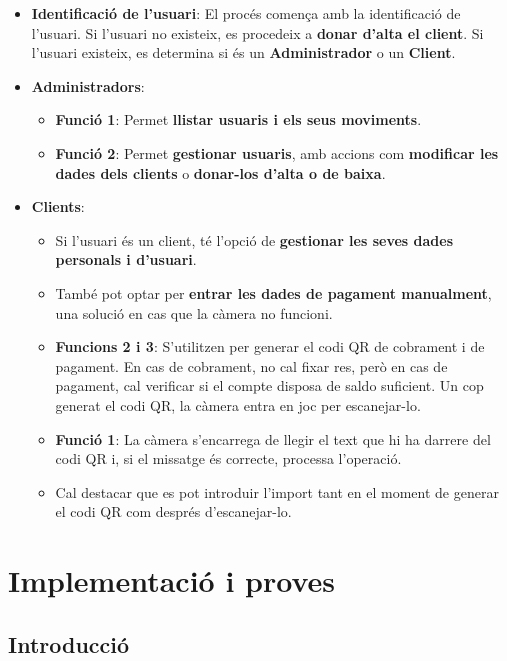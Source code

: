 \documentclass[a4paper,12pt,twoside]{ThesisStyle}
\begin{document}
\begin{itemize}
    \item \textbf{Identificació de l'usuari}: El procés comença amb la identificació de l'usuari. Si l'usuari no existeix, es procedeix a \textbf{donar d'alta el client}. Si l'usuari existeix, es determina si és un \textbf{Administrador} o un \textbf{Client}.
    
    \item \textbf{Administradors}: 
    \begin{itemize}
        \item \textbf{Funció 1}: Permet \textbf{llistar usuaris i els seus moviments}.
        \item \textbf{Funció 2}: Permet \textbf{gestionar usuaris}, amb accions com \textbf{modificar les dades dels clients} o \textbf{donar-los d'alta o de baixa}.
    \end{itemize}
    
    \item \textbf{Clients}: 
    \begin{itemize}
        \item Si l'usuari és un client, té l'opció de \textbf{gestionar les seves dades personals i d'usuari}.
        \item També pot optar per \textbf{entrar les dades de pagament manualment}, una solució en cas que la càmera no funcioni.
        \item \textbf{Funcions 2 i 3}: S'utilitzen per generar el codi QR de cobrament i de pagament. En cas de cobrament, no cal fixar res, però en cas de pagament, cal verificar si el compte disposa de saldo suficient. Un cop generat el codi QR, la càmera entra en joc per escanejar-lo.
        \item \textbf{Funció 1}: La càmera s'encarrega de llegir el text que hi ha darrere del codi QR i, si el missatge és correcte, processa l'operació.
        \item Cal destacar que es pot introduir l'import tant en el moment de generar el codi QR com després d'escanejar-lo.
    \end{itemize}
\end{itemize}




\chapter{Implementació i proves}
\label{chp:implementacio}


\section{Introducció}
\label{sec: Introducció}
\end{document}
